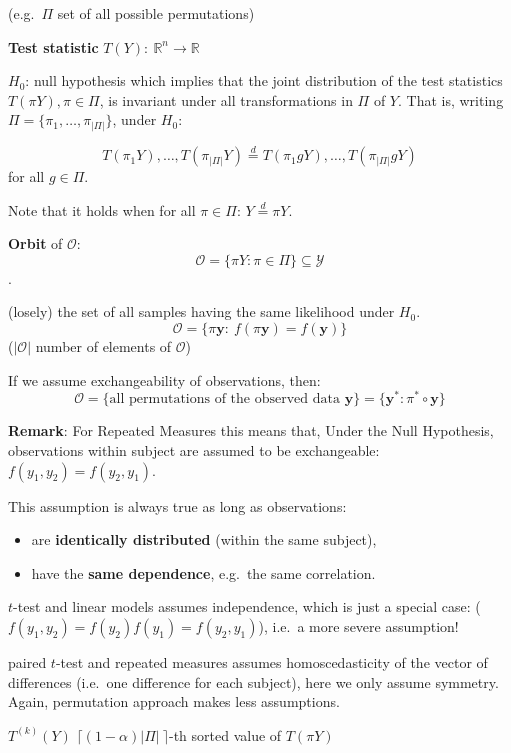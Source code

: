 \documentclass[
]{article}
\providecommand{\tightlist}{%
  \setlength{\itemsep}{0pt}\setlength{\parskip}{0pt}}
\begin{document}
(e.g.~\(\Pi\) set of all possible permutations)

\textbf{Test statistic} \(T(Y):\ \mathbb{R}^n\to\mathbb{R}\)

\(H_0\): null hypothesis which implies that the joint distribution of
the test statistics \(T(\pi Y), \pi \in \Pi\), is invariant under all
transformations in \(\Pi\) of \(Y\). That is, writing
\(\Pi = \{\pi_1,\ldots, \pi_{|\Pi|}\}\), under \(H_0\):

\[T(\pi_1 Y), \ldots, T(\pi_{|\Pi|}Y) \overset{d}{=} T(\pi_1g Y), \ldots, T(\pi_{|\Pi|}gY)\]
for all \(g \in \Pi\).

Note that it holds when for all \(\pi \in \Pi\):
\(Y \overset{d}{=}\pi Y\).

\textbf{Orbit} of \(\mathcal{O}\):
\[\mathcal{O}=\{\pi Y : \pi \in \Pi\} \subseteq \mathcal{Y}\].

(losely) the set of all samples having the same likelihood under
\(H_0\).\\
\[\mathcal{O}=\{\pi \mathbf{y}:\ f(\pi \mathbf{y})=f(\mathbf{y}) \}\]
(\(|\mathcal{O}|\) number of elements of \(\mathcal{O}\))

If we assume exchangeability of observations, then:
\[\mathcal{O}=\{\textrm{all permutations of the observed data }\mathbf{y}\} = \{\mathbf{y}^*:\pi^*\circ\mathbf{y}\}\]

\textbf{Remark}: For Repeated Measures this means that, Under the Null
Hypothesis, observations within subject are assumed to be exchangeable:
\(f(y_1,y_2)=f(y_2,y_1)\).

This assumption is always true as long as observations:

\begin{itemize}
\tightlist
\item
  are \textbf{identically distributed} (within the same subject),\\
\item
  have the \textbf{same dependence}, e.g.~the same correlation.
\end{itemize}

\(t\)-test and linear models assumes independence, which is just a
special case: (\(f(y_1,y_2)=f(y_2)f(y_1)=f(y_2,y_1)\)), i.e.~a more
severe assumption!

paired \(t\)-test and repeated measures assumes homoscedasticity of the
vector of differences (i.e.~one difference for each subject), here we
only assume symmetry. Again, permutation approach makes less
assumptions.

\(T^{(k)}(Y)\) \(\lceil(1-\alpha)|\Pi|\ \rceil\)-th sorted value of
\(T(\pi Y)\)
\end{document}
